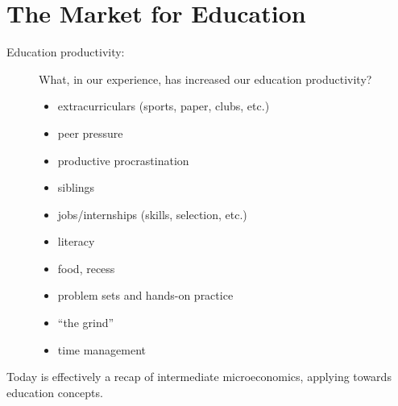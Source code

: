 \documentclass[10pt]{extarticle}
\begin{document}
  \section{The Market for Education}%
  \begin{description}
    \item[Education productivity:] What, in our experience, has increased our education productivity?
      \begin{itemize}
        \item extracurriculars (sports, paper, clubs, etc.)
        \item peer pressure
        \item productive procrastination
        \item siblings
        \item jobs/internships (skills, selection, etc.)
        \item literacy
        \item food, recess
        \item problem sets and hands-on practice
        \item ``the grind''
        \item time management
      \end{itemize}
  \end{description}
  Today is effectively a recap of intermediate microeconomics, applying towards education concepts.
\end{document}
